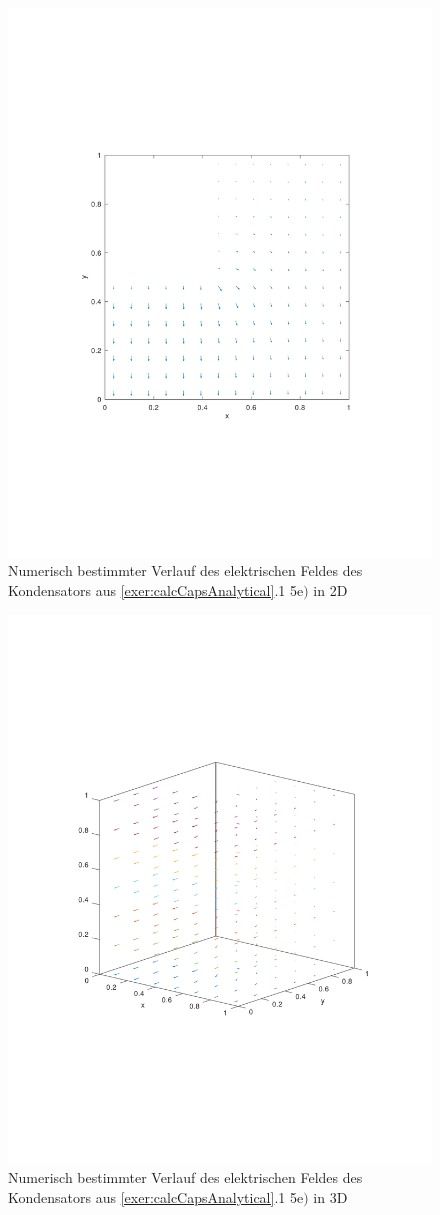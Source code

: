 \documentclass[Protokollheft.tex]{subfiles}
\begin{document}
\begin{figure}[h!]
	\centering
	\includegraphics[trim = 20mm 70mm 20mm 70mm, clip,width=0.7\linewidth]{E_2D_E.pdf}
	\caption{Numerisch bestimmter Verlauf des elektrischen Feldes des Kondensators aus \ref{exer:calcCapsAnalytical}.1 5e$)$ in 2D}
\end{figure}

\begin{figure}[h!]
	\centering
	\includegraphics[trim = 20mm 70mm 20mm 70mm, clip,width=0.7\linewidth]{E_3D_E.pdf}
	\caption{Numerisch bestimmter Verlauf des elektrischen Feldes des Kondensators aus \ref{exer:calcCapsAnalytical}.1 5e$)$ in 3D}
	\label{fig:C_5e_3D}
\end{figure}
\end{document}

